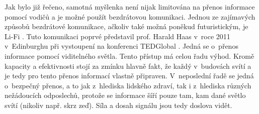 Jak bylo již řečeno, samotná myšlenka není nijak limitována na přenos informace pomocí vodičů a je možné použít bezdrátovou komunikaci. Jednou ze zajímavých způsobů bezdrátové komunikace, ačkoliv také možná poněkud futuristickým, je Li-Fi \cite{lifi}.  Tuto komunikaci poprvé představil prof. Harald Haas v~roce 2011 v~Edinburghu při vystoupení na konferenci TEDGlobal \cite{ted}. Jedná se o~přenos informace pomocí viditelného světla. Tento přístup má celou řadu výhod. Kromě kapacity a efektivnosti stojí za zmínku hlavně fakt, že každý v~budovách svítí a je tedy pro tento přenos informací vlastně připraven. V~neposlední řadě se jedná o~bezpečný přenos, a to jak z~hlediska lidského zdraví, tak i z~hlediska různých nežádoucích odposlechů, protože se informace šíří pouze tam, kam dané světlo svítí (nikoliv např. skrz zeď). Síla a dosah signálu jsou tedy doslova vidět.

